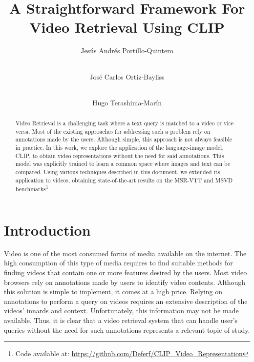 \documentclass[a4paper,runningheads]{llncs}
\begin{document}
\title{A Straightforward Framework For Video Retrieval Using CLIP}

\author{
    Jes\'{u}s Andr\'{e}s Portillo-Quintero \and \\
    Jos\'{e} Carlos Ortiz-Bayliss \and \\
    Hugo Terashima-Mar\'{i}n
}



\maketitle

\begin{abstract}
    Video Retrieval is a challenging task where a text query is matched to a video or vice versa. Most of the existing approaches for addressing such a problem rely on annotations made by the users. Although simple, this approach is not always feasible in practice. In this work, we explore the application of the language-image model, CLIP, to obtain video representations without the need for said annotations. This model was explicitly trained to learn a common space where images and text can be compared. Using various techniques described in this document, we extended its application to videos, obtaining state-of-the-art results on the MSR-VTT and MSVD benchmarks\footnote{Code available at: \url{https://github.com/Deferf/CLIP_Video_Representation}}.
\end{abstract}

\section{Introduction}
\label{sec:Introduction}

Video is one of the most consumed forms of media available on the internet. The high consumption of this type of media requires to find suitable methods for finding videos that contain one or more features desired by the users. Most video browsers rely on annotations made by users to identify video contents. Although this solution is simple to implement, it comes at a high price. Relying on annotations to perform a query on videos requires an extensive description of the videos' innards and context. Unfortunately, this information may not be made available. Thus, it is clear that a video retrieval system that can handle user's queries without the need for such annotations represents a relevant topic of study.
\end{document}
